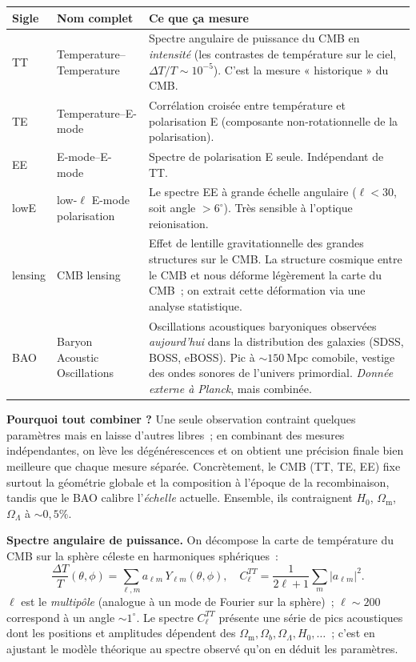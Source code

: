 \documentclass[11pt,a4paper,openany]{report}
\newcommand{\Mpc}{\text{Mpc}}
\newcommand{\Hzero}{H_{0}}
\newcommand{\Om}{\Omega_{\mathrm{m}}}
\newcommand{\OL}{\Omega_{\Lambda}}
\begin{document}
\begin{center}
\renewcommand{\arraystretch}{1.3}
\begin{tabular}{ll p{8.7cm}}
\toprule
\textbf{Sigle} & \textbf{Nom complet} & \textbf{Ce que ça mesure} \\
\midrule
TT & Temperature--Temperature & Spectre angulaire de puissance du CMB en
    \emph{intensité} (les contrastes de température sur le ciel,
    $\Delta T/T \sim 10^{-5}$). C'est la mesure « historique » du CMB. \\
TE & Temperature--E-mode & Corrélation croisée entre température et
    polarisation E (composante non-rotationnelle de la polarisation). \\
EE & E-mode--E-mode & Spectre de polarisation E seule. Indépendant de TT. \\
lowE & low-$\ell$ E-mode polarisation & Le spectre EE à grande échelle
    angulaire ($\ell < 30$, soit angle $> 6^{\circ}$). Très sensible à
    l'optique reionisation. \\
lensing & CMB lensing & Effet de lentille gravitationnelle des grandes
    structures sur le CMB. La structure cosmique entre le CMB et nous
    déforme légèrement la carte du CMB~; on extrait cette déformation
    via une analyse statistique. \\
BAO & Baryon Acoustic Oscillations & Oscillations acoustiques baryoniques
    observées \emph{aujourd'hui} dans la distribution des galaxies (SDSS,
    BOSS, eBOSS). Pic à $\sim 150~\Mpc$ comobile, vestige des ondes sonores
    de l'univers primordial. \emph{Donnée externe à Planck}, mais
    combinée. \\
\bottomrule
\end{tabular}
\end{center}

\begin{tcolorbox}[vulgarisation]
\textbf{Pourquoi tout combiner ?} Une seule observation contraint quelques
paramètres mais en laisse d'autres libres~; en combinant des mesures
indépendantes, on lève les dégénérescences et on obtient une précision finale
bien meilleure que chaque mesure séparée. Concrètement, le CMB (TT, TE, EE)
fixe surtout la géométrie globale et la composition à l'époque de la
recombinaison, tandis que le BAO calibre l'\emph{échelle} actuelle. Ensemble,
ils contraignent $\Hzero$, $\Om$, $\OL$ à $\sim 0{,}5\%$.
\end{tcolorbox}

\begin{tcolorbox}[mathspe]
\textbf{Spectre angulaire de puissance.} On décompose la carte de température
du CMB sur la sphère céleste en harmoniques sphériques~:
\[
\frac{\Delta T}{T}(\theta,\phi) = \sum_{\ell,m} a_{\ell m}\,Y_{\ell m}(\theta,\phi),
\quad C_{\ell}^{TT} = \frac{1}{2\ell+1}\sum_m |a_{\ell m}|^{2}.
\]
$\ell$ est le \emph{multipôle} (analogue à un mode de Fourier sur la sphère)~;
$\ell\sim 200$ correspond à un angle $\sim 1^{\circ}$. Le spectre $C_{\ell}^{TT}$
présente une série de pics acoustiques dont les positions et amplitudes
dépendent des $\Om, \Omega_b, \OL, \Hzero, \ldots$~; c'est en ajustant
le modèle théorique au spectre observé qu'on en déduit les paramètres.
\end{tcolorbox}
\end{document}
